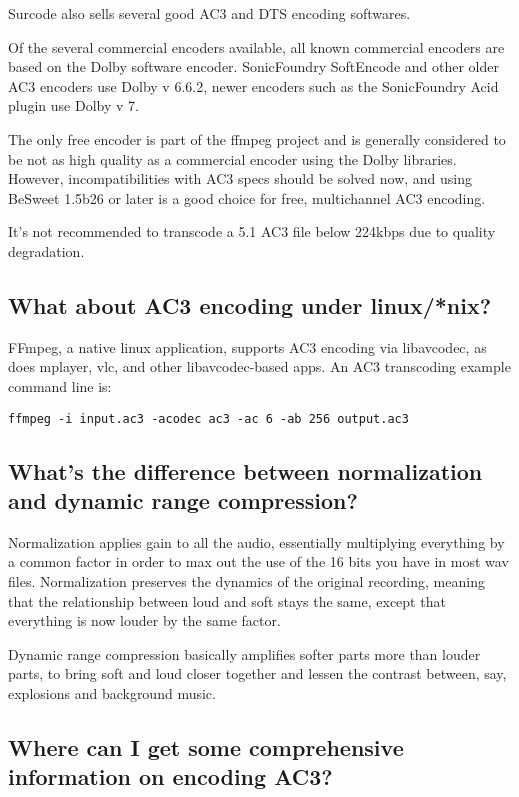 ﻿\documentclass[12pt]{article}
\begin{document}
Surcode also sells several good AC3 and DTS encoding softwares.

Of the several commercial encoders available, all known commercial encoders are based on the Dolby
software encoder. SonicFoundry SoftEncode and other older AC3 encoders use Dolby v 6.6.2, newer
encoders such as the SonicFoundry Acid plugin use Dolby v 7.

The only free encoder is part of the ffmpeg project and is generally considered to be not as high
quality as a commercial encoder using the Dolby libraries. However, incompatibilities with AC3 specs
should be solved now, and using BeSweet 1.5b26 or later is a good choice for free, multichannel AC3
encoding.

It's not recommended to transcode a 5.1 AC3 file below 224kbps due to quality degradation.

\subsection{What about AC3 encoding under linux/*nix?}

FFmpeg, a native linux application, supports AC3 encoding via libavcodec, as does mplayer, vlc, and
other libavcodec-based apps. An AC3 transcoding example command line is: 

\begin{lstlisting}
ffmpeg -i input.ac3 -acodec ac3 -ac 6 -ab 256 output.ac3
\end{lstlisting}

\subsection{What's the difference between normalization and dynamic range compression?}

Normalization applies gain to all the audio, essentially multiplying everything by a common factor
in order to max out the use of the 16 bits you have in most wav files. Normalization preserves the
dynamics of the original recording, meaning that the relationship between loud and soft stays the
same, except that everything is now louder by the same factor.

Dynamic range compression basically amplifies softer parts more than louder parts, to bring soft and
loud closer together and lessen the contrast between, say, explosions and background music.

\subsection{Where can I get some comprehensive information on encoding AC3?}
\end{document}
